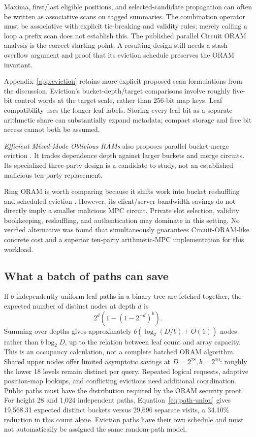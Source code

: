 \documentclass[11pt]{article}
\begin{document}
Maxima, first/last eligible positions, and selected-candidate propagation can
often be written as associative scans on tagged summaries. The combination
operator must be associative with explicit tie-breaking and validity rules;
merely calling a loop a prefix scan does not establish this. The published
parallel Circuit ORAM analysis is the correct starting point. A resulting
design still needs a stash-overflow argument and proof that its eviction
schedule preserves the ORAM invariant.

Appendix~\ref{app:eviction} retains more explicit proposed scan formulations
from the discussion. Eviction's bucket-depth/target comparisons involve roughly
five-bit control words at the target scale, rather than 256-bit map keys. Leaf
compatibility uses the longer leaf labels. Storing every leaf bit as a separate
arithmetic share can substantially expand metadata; compact storage and free
bit access cannot both be assumed.

\emph{Efficient Mixed-Mode Oblivious RAMs} also proposes parallel bucket-merge
eviction \cite{mixedmode2025}. It trades dependence depth against larger buckets
and merge circuits. Its specialized three-party design is a candidate to study,
not an established malicious ten-party replacement.

Ring ORAM is worth comparing because it shifts work into bucket reshuffling and
scheduled eviction \cite{ringoram}. However, its client/server bandwidth savings
do not directly imply a smaller malicious MPC circuit. Private slot selection,
validity bookkeeping, reshuffling, and authentication may dominate in this
setting. No verified alternative was found that simultaneously guarantees
Circuit-ORAM-like concrete cost and a superior ten-party arithmetic-MPC
implementation for this workload.

\subsection{What a batch of paths can save}

If $b$ independently uniform leaf paths in a binary tree are fetched together,
the expected number of distinct nodes at depth $d$ is
\begin{equation}
2^d\left(1-(1-2^{-d})^b\right).
\label{eq:path-union}
\end{equation}
Summing over depths gives approximately
$b(\log_2(D/b)+O(1))$ nodes rather than $b\log_2 D$, up to the relation between
leaf count and array capacity. This is an occupancy calculation, not a complete
batched ORAM algorithm. Shared upper nodes offer limited asymptotic savings at
$D=2^{28},b=2^{10}$: roughly the lower 18 levels remain distinct per query.
Repeated logical requests, adaptive position-map lookups, and conflicting
evictions need additional coordination. Public paths must have the distribution
required by the ORAM security proof.
For height 28 and 1,024 independent paths, Equation~\eqref{eq:path-union} gives
19,568.31 expected distinct buckets versus 29,696 separate visits, a 34.10\%
reduction in this count alone. Eviction paths have their own schedule and must
not automatically be assigned the same random-path model.
\end{document}
